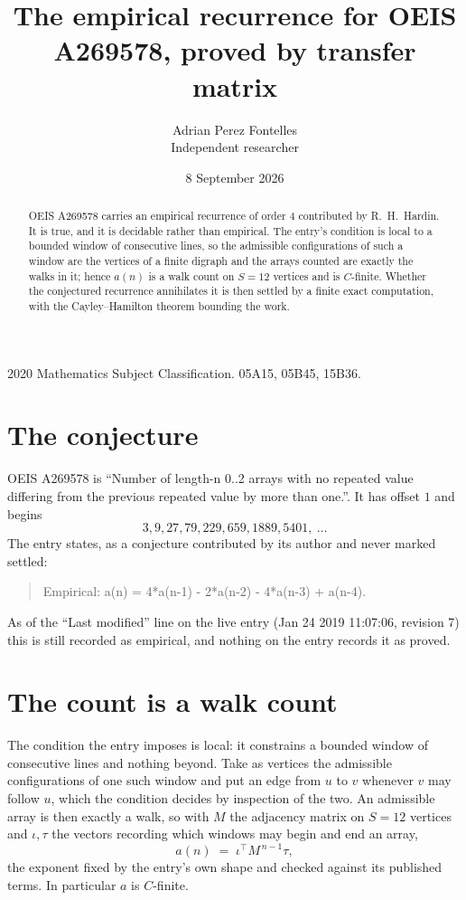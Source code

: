 \documentclass[11pt,a4paper]{article}
\title{The empirical recurrence for OEIS A269578, proved by transfer matrix}
\author{Adrian Perez Fontelles\\ \small Independent researcher}
\date{8 September 2026}
\theoremstyle{plain}
\theoremstyle{definition}
\begin{document}
\maketitle

\begin{abstract}
OEIS A269578 carries an empirical recurrence of order $4$ contributed by R.~H.~Hardin. It is
true, and it is decidable rather than empirical. The entry's condition is local to a bounded window of consecutive lines, so
the admissible configurations of such a window are the vertices of a finite digraph and the
arrays counted are exactly the walks in it; hence $a(n)$ is a walk count on $S=12$ vertices
and is $C$-finite. Whether the conjectured recurrence annihilates it is then settled by a
finite exact computation, with the Cayley--Hamilton theorem bounding the work.
\end{abstract}

\noindent\small 2020 Mathematics Subject Classification. 05A15, 05B45, 15B36.\normalsize

\section{The conjecture}

OEIS A269578 is ``Number of length-n 0..2 arrays with no repeated value differing from the previous repeated value by more than one.''. It has offset $1$ and begins
\[
3, 9, 27, 79, 229, 659, 1889, 5401,\ \dots
\]
The entry states, as a conjecture contributed by its author and never marked settled:
\begin{quote}
Empirical: a(n) = 4*a(n-1) - 2*a(n-2) - 4*a(n-3) + a(n-4).
\end{quote}
As of the ``Last modified'' line on the live entry (Jan 24 2019 11:07:06, revision 7) this is still
recorded as empirical, and nothing on the entry records it as proved.

\section{The count is a walk count}

The condition the entry imposes is local: it constrains a bounded window of consecutive lines and nothing beyond. Take as
vertices the admissible configurations of one such window and put an edge from $u$ to $v$
whenever $v$ may follow $u$, which the condition decides by inspection of the two. An
admissible array is then exactly a walk, so with $M$ the adjacency matrix on $S=12$ vertices
and $\iota,\tau$ the vectors recording which windows may begin and end an array,
\[
a(n)\;=\;\iota^{\!\top}M^{\,n-1}\tau ,
\]
the exponent fixed by the entry's own shape and checked against its published terms. In
particular $a$ is $C$-finite.
\end{document}
